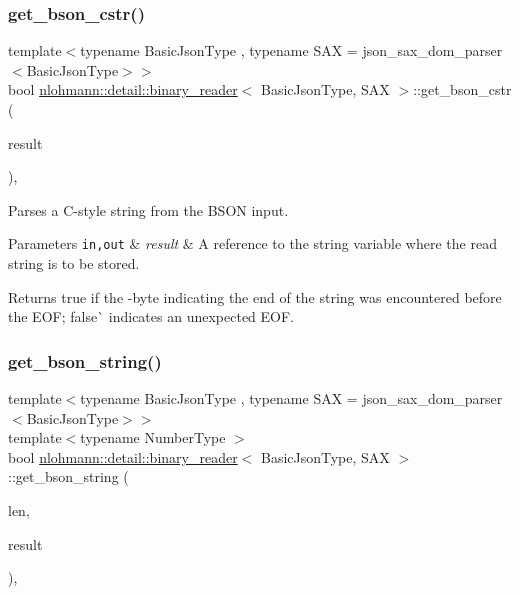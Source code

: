 \subsubsection{\texorpdfstring{get\+\_\+bson\+\_\+cstr()}{get\_bson\_cstr()}}
{\footnotesize\ttfamily template$<$typename Basic\+Json\+Type , typename S\+AX  = json\+\_\+sax\+\_\+dom\+\_\+parser$<$\+Basic\+Json\+Type$>$$>$ \\
bool \mbox{\hyperlink{classnlohmann_1_1detail_1_1binary__reader}{nlohmann\+::detail\+::binary\+\_\+reader}}$<$ Basic\+Json\+Type, S\+AX $>$\+::get\+\_\+bson\+\_\+cstr (\begin{DoxyParamCaption}\item[{string\+\_\+t \&}]{result }\end{DoxyParamCaption})\hspace{0.3cm}{\ttfamily [inline]}, {\ttfamily [private]}}



Parses a C-\/style string from the B\+S\+ON input. 


\begin{DoxyParams}[1]{Parameters}
\mbox{\tt in,out}  & {\em result} & A reference to the string variable where the read string is to be stored. \\
\hline
\end{DoxyParams}
\begin{DoxyReturn}{Returns}
{\ttfamily true} if the -\/byte indicating the end of the string was encountered before the E\+OF; false\`{} indicates an unexpected E\+OF. 
\end{DoxyReturn}
\mbox{\label{classnlohmann_1_1detail_1_1binary__reader_a46bf64d7193eea97cac6dd4d4abdb4fa}} 
\subsubsection{\texorpdfstring{get\+\_\+bson\+\_\+string()}{get\_bson\_string()}}
{\footnotesize\ttfamily template$<$typename Basic\+Json\+Type , typename S\+AX  = json\+\_\+sax\+\_\+dom\+\_\+parser$<$\+Basic\+Json\+Type$>$$>$ \\
template$<$typename Number\+Type $>$ \\
bool \mbox{\hyperlink{classnlohmann_1_1detail_1_1binary__reader}{nlohmann\+::detail\+::binary\+\_\+reader}}$<$ Basic\+Json\+Type, S\+AX $>$\+::get\+\_\+bson\+\_\+string (\begin{DoxyParamCaption}\item[{const Number\+Type}]{len,  }\item[{string\+\_\+t \&}]{result }\end{DoxyParamCaption})\hspace{0.3cm}{\ttfamily [inline]}, {\ttfamily [private]}}



